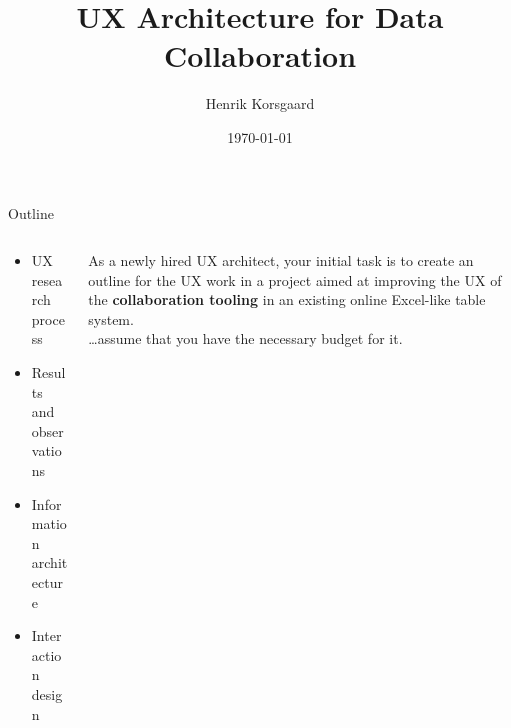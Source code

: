 \documentclass[aspectratio=169]{beamer}
\title[Stibo Systems Case Presentation]{UX Architecture for Data Collaboration}
\date[]{\today}
\author[]{Henrik Korsgaard}
\institute{DEPARTMENT OF COMPUTER SCIENCE} %
\begin{document}
\begin{frame}
\maketitle
\end{frame}

\begin{frame}{Outline}
    \begin{columns}
        \begin{column}{0.5\textwidth}
            \begin{itemize}
                \item UX research process
                \item Results and observations
                \item Information architecture
                \item Interaction design
            \end{itemize}
        \end{column}
        \begin{column}{0.5\textwidth}
            As a newly hired UX architect, your initial task is to create an outline for the UX work in a project aimed at improving the UX of the \textbf{collaboration tooling} in an existing online Excel-like table system.\\
            \vspace{1em}
            {\color{HenrikFontLight}\dots assume that you have the necessary budget for it.}
        \end{column}
    \end{columns}
\end{frame}
\end{document}
